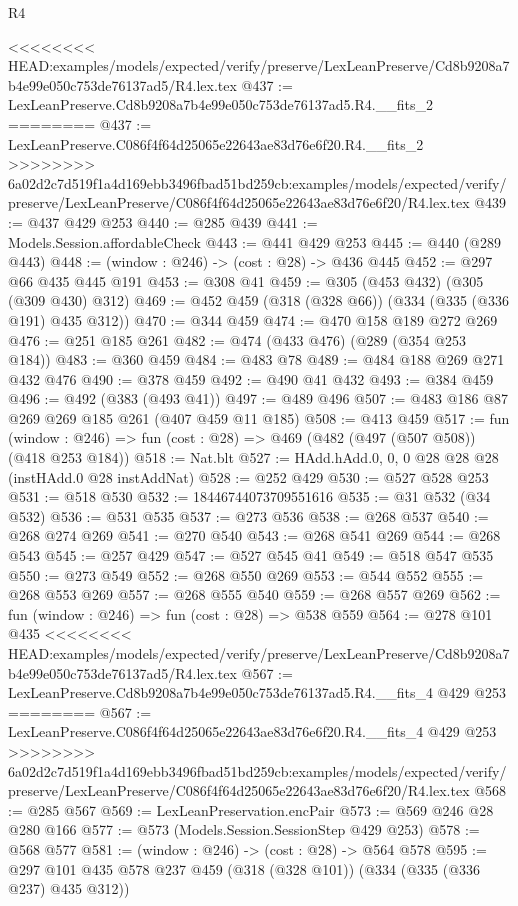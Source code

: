 \begin{lexlean}{R4}
\begin{coremodule}
{{{{{{{{{{{{{{<<<<<<<< HEAD:examples/models/expected/verify/preserve/LexLeanPreserve/Cd8b9208a7b4e99e050c753de76137ad5/R4.lex.tex
@437 := LexLeanPreserve.Cd8b9208a7b4e99e050c753de76137ad5.R4.__fits_2
========
@437 := LexLeanPreserve.C086f4f64d25065e22643ae83d76e6f20.R4.__fits_2
>>>>>>>> 6a02d2c7d519f1a4d169ebb3496fbad51bd259cb:examples/models/expected/verify/preserve/LexLeanPreserve/C086f4f64d25065e22643ae83d76e6f20/R4.lex.tex
@439 := @437 @429 @253
@440 := @285 @439
@441 := Models.Session.affordableCheck
@443 := @441 @429 @253
@445 := @440 (@289 @443)
@448 := (window : @246) -> (cost : @28) -> @436 @445
@452 := @297 @66 @435 @445 @191
@453 := @308 @41
@459 := @305 (@453 @432) (@305 (@309 @430) @312)
@469 := @452 @459 (@318 (@328 @66)) (@334 (@335 (@336 @191) @435 @312))
@470 := @344 @459
@474 := @470 @158 @189 @272 @269
@476 := @251 @185 @261
@482 := @474 (@433 @476) (@289 (@354 @253 @184))
@483 := @360 @459
@484 := @483 @78
@489 := @484 @188 @269 @271 @432 @476
@490 := @378 @459
@492 := @490 @41 @432
@493 := @384 @459
@496 := @492 (@383 (@493 @41))
@497 := @489 @496
@507 := @483 @186 @87 @269 @269 @185 @261 (@407 @459 @11 @185)
@508 := @413 @459
@517 := fun (window : @246) => fun (cost : @28) => @469 (@482 (@497 (@507 @508)) (@418 @253 @184))
@518 := Nat.blt
@527 := HAdd.hAdd.{0, 0, 0} @28 @28 @28 (instHAdd.{0} @28 instAddNat)
@528 := @252 @429
@530 := @527 @528 @253
@531 := @518 @530
@532 := 18446744073709551616
@535 := @31 @532 (@34 @532)
@536 := @531 @535
@537 := @273 @536
@538 := @268 @537
@540 := @268 @274 @269
@541 := @270 @540
@543 := @268 @541 @269
@544 := @268 @543
@545 := @257 @429
@547 := @527 @545 @41
@549 := @518 @547 @535
@550 := @273 @549
@552 := @268 @550 @269
@553 := @544 @552
@555 := @268 @553 @269
@557 := @268 @555 @540
@559 := @268 @557 @269
@562 := fun (window : @246) => fun (cost : @28) => @538 @559
@564 := @278 @101 @435
<<<<<<<< HEAD:examples/models/expected/verify/preserve/LexLeanPreserve/Cd8b9208a7b4e99e050c753de76137ad5/R4.lex.tex
@567 := LexLeanPreserve.Cd8b9208a7b4e99e050c753de76137ad5.R4.__fits_4 @429 @253
========
@567 := LexLeanPreserve.C086f4f64d25065e22643ae83d76e6f20.R4.__fits_4 @429 @253
>>>>>>>> 6a02d2c7d519f1a4d169ebb3496fbad51bd259cb:examples/models/expected/verify/preserve/LexLeanPreserve/C086f4f64d25065e22643ae83d76e6f20/R4.lex.tex
@568 := @285 @567
@569 := LexLeanPreservation.encPair
@573 := @569 @246 @28 @280 @166
@577 := @573 (Models.Session.SessionStep @429 @253)
@578 := @568 @577
@581 := (window : @246) -> (cost : @28) -> @564 @578
@595 := @297 @101 @435 @578 @237 @459 (@318 (@328 @101)) (@334 (@335 (@336 @237) @435 @312))
}}}}}}}}}}}}}}
\end{coremodule}
\end{lexlean}
